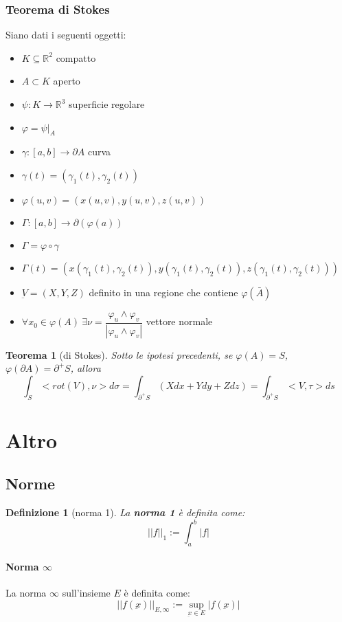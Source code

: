 \documentclass[a4paper,12pt]{article}
\newtheorem{teo}{Teorema}
\newtheorem{defi}{Definizione}
\begin{document}
\subsubsection{Teorema di Stokes}
Siano dati i seguenti oggetti:
\begin{itemize}
 \item $K\subseteq\mathbb{R}^2$ compatto
 \item $A\subset K$ aperto
 \item $\psi: K\rightarrow\mathbb{R}^3$ superficie regolare
 \item $\varphi = \psi|_A$
 \item $\gamma:[a,b]\rightarrow\partial A$ curva
 \item $\gamma(t) = (\gamma_1(t), \gamma_2(t))$
 \item $\varphi(u,v) = (x(u, v), y(u, v), z(u, v))$
 \item $\Gamma:[a, b]\rightarrow\partial(\varphi(a))$
 \item $\Gamma = \varphi\circ\gamma$
 \item $\Gamma(t)=(x(\gamma_1(t), \gamma_2(t)), y(\gamma_1(t), \gamma_2(t)), z(\gamma_1(t), \gamma_2(t)))$
 \item $\underbar{V} = (X, Y, Z)$ definito in una regione che contiene $\varphi(\bar{A})$
 \item $\forall x_0 \in \varphi(A)\ \exists \nu = \dfrac{\varphi_u\wedge\varphi_v}{|\varphi_u\wedge\varphi_v|}$ vettore normale
\end{itemize}

\begin{teo}[di Stokes]
 Sotto le ipotesi precedenti, se $\varphi(A) = S$, $\varphi(\partial A)=\partial^+S$, allora
 $$\int_S <rot(V), \nu>d\sigma = \int_{\partial^+S}(Xdx+Ydy+Zdz) = \int_{\partial^+S}<V, \tau>ds$$
\end{teo}



\section{Altro}
\subsection{Norme}
\begin{defi}[norma 1]
La \textbf{norma 1} è definita come:
$$||f||_1 := \int_a^b|f|$$
\end{defi}
\paragraph{Norma $\infty$}
La norma $\infty$ sull'insieme $E$ è definita come:
$$||f(\underbar{x})||_{E,\infty} := \sup_{\underbar{x}\in E} |f(\underbar{x})|$$
\end{document}
